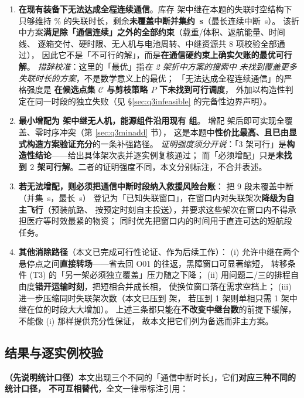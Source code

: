 \documentclass[12pt,a4paper,fontset=windows]{ctexart}
\begin{document}
\begin{enumerate}[leftmargin=2.2em,itemsep=2pt]
\item \textbf{在现有装备下无法达成全程连续通信}。库存 \RelayN{} 架中继在本题的失联时空结构下
只够维持 \QthreeCompromiseCoverPct\% 的失联时长，剩余\textbf{未覆盖中断并集约
\QthreeCompromiseUncoveredS\,s}（最长连续中断 \QthreeCompromiseLongestS\,s）。
该折中方案\textbf{满足除「通信连续」之外的全部约束}（载重/体积、返航能量、时间线、
逐箱交付、硬时限、无人机与电池周转、中继资源共 8 项校验全部通过），
因此它不是「不可行的解」，而是\textbf{在通信硬约束上确实欠账的最优可行解}。
\emph{措辞校准}：这里的「最优」指\emph{在 2 架折中方案的搜索中
未找到覆盖更多失联时长的方案}，不是数学意义上的最优；
「无法达成全程连续通信」的严格强度是
\textbf{在候选点集 $\mathcal{C}$ 与剪枝策略 $P$ 下未找到可行调度}，
外加以构造性判定在同一时段的独立失败（见 \S\ref{sec:q3infeasible} 的完备性边界声明）。
\item \textbf{最小增配为 \QthreeGapN{} 架中继无人机，能源组件沿用现有 \RelayBat{} 组}。
增配 \QthreeGapN{} 架后即可实现全覆盖、零时序冲突（第 \ref{sec:q3minadd} 节），
这是本题中\textbf{性价比最高、且已由显式构造方案验证充分}的一条补强路径。
\emph{证明强度须分开说}：「$3$ 架可行」是\textbf{构造性结论}——给出具体架次表并逐实例复核通过；
而「必须增配」只是\textbf{未找到 $2$ 架可行解}。二者的证明强度不同，本文分别标注，不合并表述。
\item \textbf{若无法增配，则必须把通信中断时段纳入救援风险台账}：
把 9 段未覆盖中断（并集 \QthreeCompromiseUncoveredS\,s，最长 \QthreeCompromiseLongestS\,s）
登记为「已知失联窗口」，在窗口内对失联架次\textbf{降级为自主飞行}（预装航路、
按预定时刻自主投送），并要求这些架次在窗口内不得承担医疗等时效最紧的物资；
同时优先把窗口内的时间用于直连可达的短航段任务。
\item \textbf{其他消除路径}（本文已完成可行性论证、作为后续工作）：
(i) 允许中继在两个悬停点之间\textbf{直接转场}——省去回 O01 的往返，黑障窗口可显著缩短，
转移条件 (T3) 的「另一架必须独立覆盖」压力随之下降；
(ii) 用问题二/三的排程自由度\textbf{错开运输时刻}，把短相合并成长相，
使换位窗口落在需求空档上；
(iii) 进一步压缩同时失联架次数（本文已压到 \QthreeDpPeakConcurrent{} 架，
若压到 1 架则单相只需 1 架中继在位的时段大大增加）。
上述三条都只能在\textbf{不改变中继台数}的前提下缓解，不能像 (i) 那样提供充分性保证，
故本文把它们列为备选而非主方案。
\end{enumerate}

\subsection{结果与逐实例校验}
\noindent\textbf{（先说明统计口径）}本文出现三个不同的「通信中断时长」，它们\textbf{对应三种不同的统计口径，
不可互相替代}，全文一律带标注引用：
\end{document}

